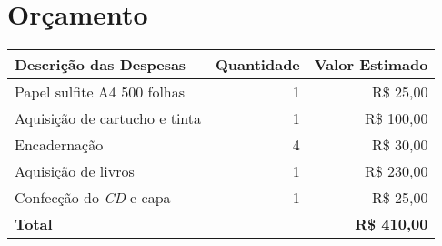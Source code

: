 \section{Orçamento}\label{lorcamento}

\begin{center}
  \tiny
  \begin{tabular}{| l | r | r |}
    \hline
      \textbf{Descrição das Despesas} & \textbf{Quantidade} & \textbf{Valor Estimado} \\
    \hline
      Papel sulfite A4 500 folhas & 1 & R\$ 25,00 \\
    \hline
      Aquisição de cartucho e tinta & 1 & R\$ 100,00 \\
    \hline
      Encadernação & 4 & R\$ 30,00 \\
    \hline
      Aquisição de livros & 1 & R\$ 230,00 \\
    \hline
      Confecção do \emph{CD} e capa & 1 & R\$ 25,00 \\
    \hline
      \textbf{Total} & & \textbf{R\$ 410,00} \\
  \hline
  \end{tabular}
\end{center}
